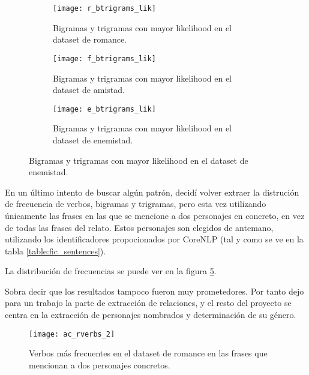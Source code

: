 \documentclass{pre-tfg}
\begin{document}
\begin{figure}[t!]
	\centering
	
	\begin{subfigure}{\textwidth}
		\texttt{[image: r\_btrigrams\_lik]}
		\caption{Bigramas y trigramas con mayor likelihood en el dataset de romance.}
		\label{fig:r_btrigram_lik}
	\end{subfigure}

	\begin{subfigure}{\textwidth}
		\texttt{[image: f\_btrigrams\_lik]}
		\caption{Bigramas y trigramas con mayor likelihood en el dataset de amistad.}
		\label{fig:f_btrigram_lik}
	\end{subfigure}

	\begin{subfigure}{\textwidth}
		\texttt{[image: e\_btrigrams\_lik]}
		\caption{Bigramas y trigramas con mayor likelihood en el dataset de enemistad.}
		\label{fig:e_btrigram_lik}
	\end{subfigure}
\end{figure}

En un último intento de buscar algún patrón, decidí volver extraer la distrución de frecuencia de verbos, bigramas y trigramas, pero esta vez utilizando únicamente las frases en las que se mencione a dos personajes en concreto, en vez de todas las frases del relato. Estos personajes son elegidos de antemano, utilizando los identificadores propocionados por CoreNLP (tal y como se ve en la tabla \ref{table:fic_sentences}).

 La distribución de frecuencias se puede ver en la figura \ref{fig:r_verb_freq_in_character_mentions}.
 
 Sobra decir que los resultados tampoco fueron muy prometedores. Por tanto dejo para un trabajo la parte de extracción de relaciones, y el resto del proyecto se centra en la extracción de personajes nombrados y determinación de su género.

\begin{figure}
	\centering
	\texttt{[image: ac\_rverbs\_2]}
	\caption{Verbos más frecuentes en el dataset de romance en las frases que mencionan a dos personajes concretos.}
	\label{fig:r_verb_freq_in_character_mentions}
\end{figure}


\begin{comment}

\begin{figure}
	\centering
	\texttt{[image: ac\_fverbs\_2]}
	\caption{Verbos más frecuentes en el dataset de amsitad en las frases que mencionan a dos personajes concretos.}
	\label{fig:f_verb_freq_in_character_mentions}
\end{figure}


\begin{figure}
	\centering
	\texttt{[image: crowhas\_everbs\_0]}
	\caption{Verbos más frecuentes en el dataset de enemistad en las frases que mencionan a dos personajes concretos.}
	\label{fig:e_verb_freq_in_character_mentions}
\end{figure}

\end{comment}
\end{document}
